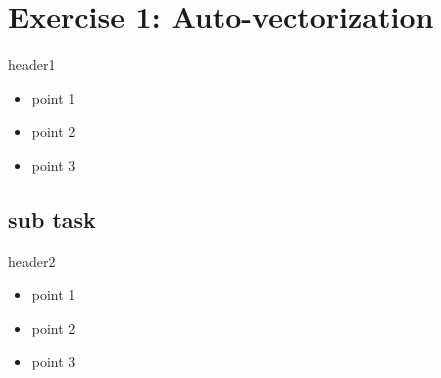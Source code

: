 \section{Exercise 1: Auto-vectorization}
\begin{frame}{header1}
\begin{itemize}
\item point 1
\item point 2
\item point 3
\end{itemize}
\end{frame}

\subsection{sub task}
\begin{frame}{header2}
\begin{itemize}
\item point 1
\item point 2
\item point 3
\end{itemize}
\end{frame}
